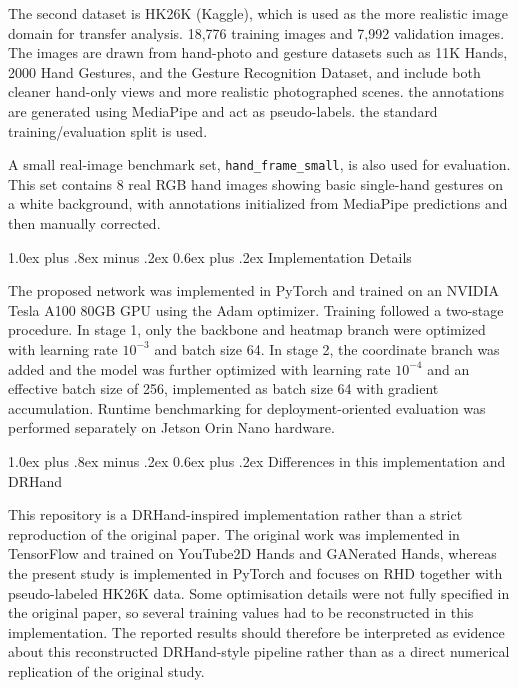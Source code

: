 \documentclass[10pt,letterpaper]{article}
\makeatletter
\renewcommand\subsection{\@startsection{subsection}{2}{\z@}%
  {1.0ex plus .8ex minus .2ex}%
  {0.6ex plus .2ex}%
  {\normalfont\itshape}}
\makeatother
\begin{document}
The second dataset is HK26K (Kaggle), which is used as the more realistic image domain for transfer analysis. 18,776 training images and 7,992 validation images. The images are drawn from hand-photo and gesture datasets such as 11K Hands, 2000 Hand Gestures, and the Gesture Recognition Dataset, and include both cleaner hand-only views and more realistic photographed scenes. the annotations are generated using MediaPipe and act as pseudo-labels. the standard training/evaluation split is used.

A small real-image benchmark set, \texttt{hand\_frame\_small}, is also used for evaluation. This set contains 8 real RGB hand images showing basic single-hand gestures on a white background, with annotations initialized from MediaPipe predictions and then manually corrected.

\subsection{Implementation Details}

The proposed network was implemented in PyTorch and trained on an NVIDIA Tesla A100 80GB GPU using the Adam optimizer. Training followed a two-stage procedure. In stage 1, only the backbone and heatmap branch were optimized with learning rate \(10^{-3}\) and batch size 64. In stage 2, the coordinate branch was added and the model was further optimized with learning rate \(10^{-4}\) and an effective batch size of 256, implemented as batch size 64 with gradient accumulation. Runtime benchmarking for deployment-oriented evaluation was performed separately on Jetson Orin Nano hardware.

\subsection{Differences in this implementation and DRHand}

\noindent This repository is a DRHand-inspired implementation rather than a strict reproduction of the original paper. The original work was implemented in TensorFlow and trained on YouTube2D Hands and GANerated Hands, whereas the present study is implemented in PyTorch and focuses on RHD together with pseudo-labeled HK26K data. Some optimisation details were not fully specified in the original paper, so several training values had to be reconstructed in this implementation. The reported results should therefore be interpreted as evidence about this reconstructed DRHand-style pipeline rather than as a direct numerical replication of the original study.
\end{document}
